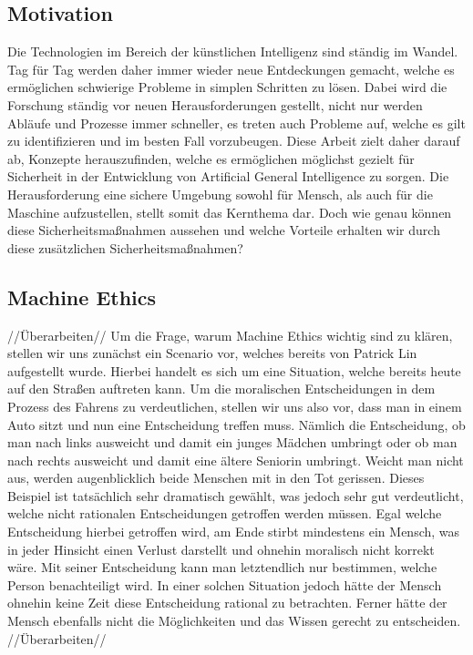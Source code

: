         \subsection{Motivation}
            Die Technologien im Bereich der künstlichen Intelligenz sind ständig im Wandel. Tag für Tag
            werden daher immer wieder neue Entdeckungen gemacht, welche es ermöglichen schwierige Probleme
            in simplen Schritten zu lösen. Dabei wird die Forschung ständig vor neuen Herausforderungen
            gestellt, nicht nur werden Abläufe und Prozesse immer schneller, es treten auch Probleme auf,
            welche es gilt zu identifizieren und im besten Fall vorzubeugen. Diese Arbeit zielt daher
            darauf ab, Konzepte herauszufinden, welche es ermöglichen möglichst gezielt für Sicherheit
            in der Entwicklung von Artificial General Intelligence zu sorgen. Die Herausforderung eine
            sichere Umgebung sowohl für Mensch, als auch für die Maschine aufzustellen, stellt somit das
            Kernthema dar. Doch wie genau können diese Sicherheitsmaßnahmen aussehen und welche Vorteile erhalten
            wir durch diese zusätzlichen Sicherheitsmaßnahmen?

        \subsection{Machine Ethics}
            //Überarbeiten//
            Um die Frage, warum Machine Ethics wichtig sind zu klären, stellen wir uns zunächst ein
            Scenario vor, welches bereits von Patrick Lin aufgestellt wurde. \cite[p. 70]{maurer_gerdes_lenz_winner_2015}
            Hierbei handelt es sich um eine Situation, welche bereits heute auf den
            Straßen auftreten kann. Um die moralischen Entscheidungen in dem Prozess des Fahrens zu
            verdeutlichen, stellen wir uns also vor, dass man in einem Auto sitzt und nun eine
            Entscheidung treffen muss. Nämlich die Entscheidung, ob man nach links ausweicht und damit
            ein junges Mädchen umbringt oder ob man nach rechts ausweicht und damit eine ältere
            Seniorin umbringt. Weicht man nicht aus, werden augenblicklich beide Menschen mit in den
            Tot gerissen. Dieses Beispiel ist tatsächlich sehr dramatisch gewählt, was jedoch sehr gut
            verdeutlicht, welche nicht rationalen Entscheidungen getroffen werden müssen. Egal welche
            Entscheidung hierbei getroffen wird, am Ende stirbt mindestens ein Mensch, was in jeder
            Hinsicht einen Verlust darstellt und ohnehin moralisch nicht korrekt wäre. \cite[p. 70]{maurer_gerdes_lenz_winner_2015}
            Mit seiner Entscheidung kann man letztendlich nur bestimmen, welche Person benachteiligt
            wird. In einer solchen Situation jedoch hätte der Mensch ohnehin keine Zeit diese Entscheidung
            rational zu betrachten. Ferner hätte der Mensch ebenfalls nicht die Möglichkeiten und
            das Wissen gerecht zu entscheiden.
            //Überarbeiten//

